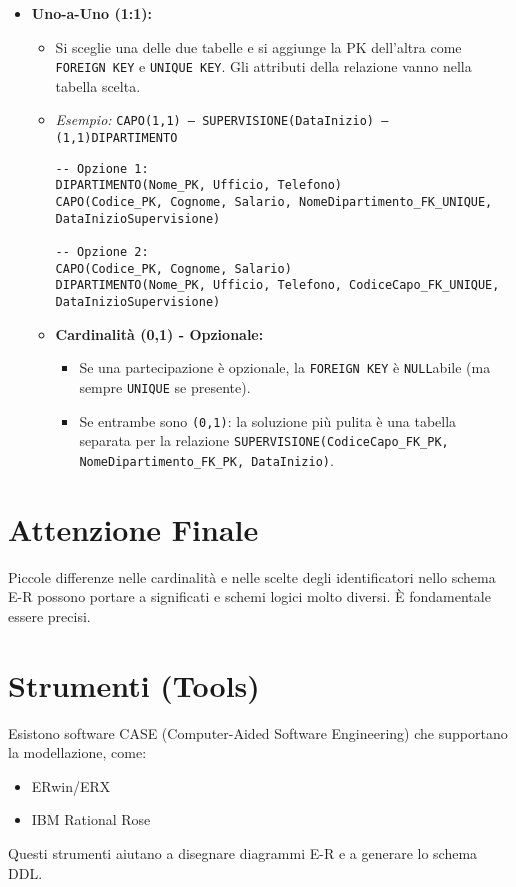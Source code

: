 \documentclass{article}
\begin{document}
\begin{itemize}
\begin{itemize}
			\item \textbf{Uno-a-Uno (1:1):}
			\begin{itemize}
				\item Si sceglie una delle due tabelle e si aggiunge la PK dell'altra come \texttt{FOREIGN KEY} e \texttt{UNIQUE KEY}. Gli attributi della relazione vanno nella tabella scelta.
				\item \textit{Esempio:} \texttt{CAPO(1,1) --- SUPERVISIONE(DataInizio) --- (1,1)DIPARTIMENTO}
				\begin{verbatim}
-- Opzione 1:
DIPARTIMENTO(Nome_PK, Ufficio, Telefono)
CAPO(Codice_PK, Cognome, Salario, NomeDipartimento_FK_UNIQUE, DataInizioSupervisione)

-- Opzione 2:
CAPO(Codice_PK, Cognome, Salario)
DIPARTIMENTO(Nome_PK, Ufficio, Telefono, CodiceCapo_FK_UNIQUE, DataInizioSupervisione)
				\end{verbatim}
				\item \textbf{Cardinalità (0,1) - Opzionale:}
				\begin{itemize}
					\item Se una partecipazione è opzionale, la \texttt{FOREIGN KEY} è \texttt{NULL}abile (ma sempre \texttt{UNIQUE} se presente).
					\item Se entrambe sono \texttt{(0,1)}: la soluzione più pulita è una tabella separata per la relazione \texttt{SUPERVISIONE(CodiceCapo\_FK\_PK, NomeDipartimento\_FK\_PK, DataInizio)}.
				\end{itemize}
			\end{itemize}
		\end{itemize}
	\end{itemize}
	
	\section{Attenzione Finale}
	Piccole differenze nelle cardinalità e nelle scelte degli identificatori nello schema E-R possono portare a significati e schemi logici molto diversi. È fondamentale essere precisi.
	
	\section{Strumenti (Tools)}
	Esistono software CASE (Computer-Aided Software Engineering) che supportano la modellazione, come:
	\begin{itemize}
		\item ERwin/ERX
		\item IBM Rational Rose
	\end{itemize}
	Questi strumenti aiutano a disegnare diagrammi E-R e a generare lo schema DDL.
	
\end{document}
